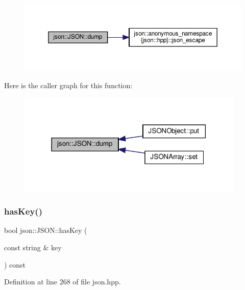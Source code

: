 \nopagebreak
\begin{figure}[H]
\begin{center}
\leavevmode
\includegraphics[width=350pt]{classjson_1_1_j_s_o_n_acb99af0df2045a504f6bbc08bf5c4990_cgraph}
\end{center}
\end{figure}
Here is the caller graph for this function\+:
\nopagebreak
\begin{figure}[H]
\begin{center}
\leavevmode
\includegraphics[width=306pt]{classjson_1_1_j_s_o_n_acb99af0df2045a504f6bbc08bf5c4990_icgraph}
\end{center}
\end{figure}
\mbox{\label{classjson_1_1_j_s_o_n_a87283b4ab9833535d16018634421c090}} 
\subsubsection{\texorpdfstring{has\+Key()}{hasKey()}}
{\footnotesize\ttfamily bool json\+::\+J\+S\+O\+N\+::has\+Key (\begin{DoxyParamCaption}\item[{const string \&}]{key }\end{DoxyParamCaption}) const\hspace{0.3cm}{\ttfamily [inline]}}



Definition at line 268 of file json.\+hpp.




